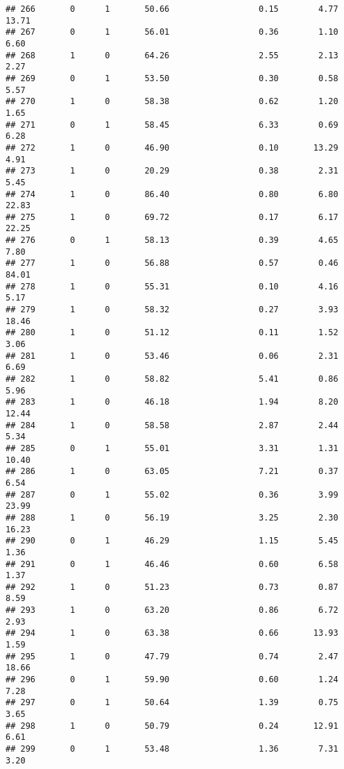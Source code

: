 \documentclass[
]{article}
\begin{document}
\begin{verbatim}
## 266       0      1       50.66                  0.15        4.77       13.71
## 267       0      1       56.01                  0.36        1.10        6.60
## 268       1      0       64.26                  2.55        2.13        2.27
## 269       0      1       53.50                  0.30        0.58        5.57
## 270       1      0       58.38                  0.62        1.20        1.65
## 271       0      1       58.45                  6.33        0.69        6.28
## 272       1      0       46.90                  0.10       13.29        4.91
## 273       1      0       20.29                  0.38        2.31        5.45
## 274       1      0       86.40                  0.80        6.80       22.83
## 275       1      0       69.72                  0.17        6.17       22.25
## 276       0      1       58.13                  0.39        4.65        7.80
## 277       1      0       56.88                  0.57        0.46       84.01
## 278       1      0       55.31                  0.10        4.16        5.17
## 279       1      0       58.32                  0.27        3.93       18.46
## 280       1      0       51.12                  0.11        1.52        3.06
## 281       1      0       53.46                  0.06        2.31        6.69
## 282       1      0       58.82                  5.41        0.86        5.96
## 283       1      0       46.18                  1.94        8.20       12.44
## 284       1      0       58.58                  2.87        2.44        5.34
## 285       0      1       55.01                  3.31        1.31       10.40
## 286       1      0       63.05                  7.21        0.37        6.54
## 287       0      1       55.02                  0.36        3.99       23.99
## 288       1      0       56.19                  3.25        2.30       16.23
## 290       0      1       46.29                  1.15        5.45        1.36
## 291       0      1       46.46                  0.60        6.58        1.37
## 292       1      0       51.23                  0.73        0.87        8.59
## 293       1      0       63.20                  0.86        6.72        2.93
## 294       1      0       63.38                  0.66       13.93        1.59
## 295       1      0       47.79                  0.74        2.47       18.66
## 296       0      1       59.90                  0.60        1.24        7.28
## 297       0      1       50.64                  1.39        0.75        3.65
## 298       1      0       50.79                  0.24       12.91        6.61
## 299       0      1       53.48                  1.36        7.31        3.20

\end{verbatim}
\end{document}
